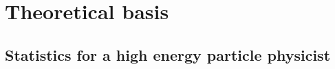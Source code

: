 
\frontmatter





\tableofcontents*
{}  %
\newpage




\mainmatter
\chapter[An introduction to the theory]{Theoretical basis}





\section{Statistics for a high energy particle physicist}

